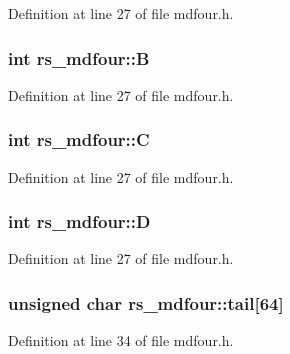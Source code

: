 Definition at line 27 of file mdfour.\+h.

\hypertarget{structrs__mdfour_a528e4b2a18f4c1a8438ba472b219f7af}{}
\subsubsection[{B}]{\setlength{\rightskip}{0pt plus 5cm}int rs\+\_\+mdfour\+::\+B}\label{structrs__mdfour_a528e4b2a18f4c1a8438ba472b219f7af}


Definition at line 27 of file mdfour.\+h.

\hypertarget{structrs__mdfour_a9e9e03370852b661218170ba16088726}{}
\subsubsection[{C}]{\setlength{\rightskip}{0pt plus 5cm}int rs\+\_\+mdfour\+::\+C}\label{structrs__mdfour_a9e9e03370852b661218170ba16088726}


Definition at line 27 of file mdfour.\+h.

\hypertarget{structrs__mdfour_a22ab9b9509cab3d712ef8cf5690ff9bb}{}
\subsubsection[{D}]{\setlength{\rightskip}{0pt plus 5cm}int rs\+\_\+mdfour\+::\+D}\label{structrs__mdfour_a22ab9b9509cab3d712ef8cf5690ff9bb}


Definition at line 27 of file mdfour.\+h.

\hypertarget{structrs__mdfour_a207f0a66c953b28cfb3c4565b3c66259}{}
\subsubsection[{tail}]{\setlength{\rightskip}{0pt plus 5cm}unsigned char rs\+\_\+mdfour\+::tail\mbox{[}64\mbox{]}}\label{structrs__mdfour_a207f0a66c953b28cfb3c4565b3c66259}


Definition at line 34 of file mdfour.\+h.

\hypertarget{structrs__mdfour_a8c0d1c9166566478913b96aa9b6831da}{}
